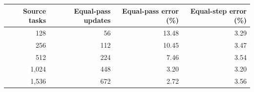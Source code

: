 \begin{tabular}{r rrr}\toprule
Source tasks&Equal-pass updates&Equal-pass error (\%)&Equal-step error (\%)\\
\midrule
128 & 56 & 13.48 & 3.29 \\
256 & 112 & 10.45 & 3.47 \\
512 & 224 & 7.46 & 3.54 \\
1,024 & 448 & 3.20 & 3.20 \\
1,536 & 672 & 2.72 & 3.56 \\
\bottomrule\end{tabular}
